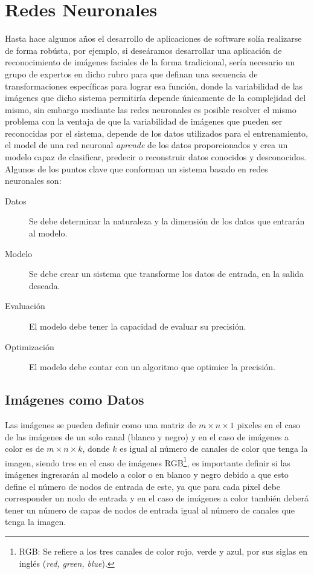 \section{Redes Neuronales}

Hasta hace algunos años el desarrollo de aplicaciones de software solía realizarse de forma robústa, por ejemplo, si deseáramos desarrollar una aplicación de reconocimiento de imágenes faciales de la forma tradicional, sería necesario un grupo de expertos en dicho rubro para que definan una secuencia de transformaciones específicas para lograr esa función, donde la variabilidad de las imágenes que dicho sistema permitiría depende únicamente de la complejidad del mismo, sin embargo mediante las redes neuronales es posible resolver el mismo problema con la ventaja de que la variabilidad de imágenes que pueden ser reconocidas por el sistema, depende de los datos utilizados para el entrenamiento, el model de una red neuronal \emph{aprende} de los datos proporcionados y crea un modelo capaz de clasificar, predecir o reconstruir datos conocidos y desconocidos. Algunos de los puntos clave que conforman un sistema basado en redes neuronales son:

\begin{description}
    \item[Datos]{Se debe determinar la naturaleza y la dimensión de los datos que entrarán al modelo.}
    \item[Modelo] {Se debe crear un sistema que transforme los datos de entrada, en la salida deseada.}
    \item[Evaluación] {El modelo debe tener la capacidad de evaluar su precisión.}
    \item[Optimización] {El modelo debe contar con un algoritmo que optimice la precisión.}
\end{description}

\subsection{Imágenes como Datos}
Las imágenes se pueden definir como una matriz de $m \times n \times 1$ pixeles en el caso de las imágenes de un solo canal (blanco y negro) y en el caso de imágenes a color es de $m \times n \times k$, donde $k$ es igual al número de canales de color que tenga la imagen, siendo tres en el caso de imágenes RGB\footnote{RGB: Se refiere a los tres canales de color rojo, verde y azul, por sus siglas en inglés (\emph{red, green, blue}).}, es importante definir si las imágenes ingresarán al modelo a color o en blanco y negro debido a que esto define el número de nodos de entrada de este, ya que para cada pixel debe corresponder un nodo de entrada y en el caso de imágenes a color también deberá tener un número de capas de nodos de entrada igual al número de canales que tenga la imagen.

